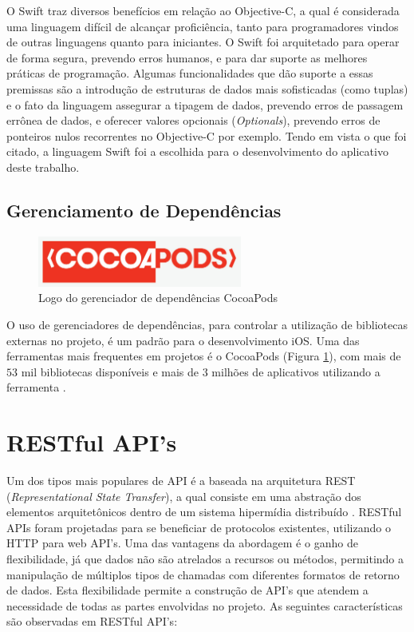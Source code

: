 O Swift traz diversos benefícios em relação ao Objective-C, a qual é considerada uma linguagem difícil de alcançar proficiência, tanto para programadores vindos de outras linguagens quanto para iniciantes. O Swift foi arquitetado para operar de forma segura, prevendo erros humanos, e para dar suporte as melhores práticas de programação. Algumas funcionalidades que dão suporte a essas premissas são a introdução de estruturas de dados mais sofisticadas (como tuplas) e o fato da linguagem assegurar a tipagem de dados, prevendo erros de passagem errônea de dados, e oferecer valores opcionais (\textit{Optionals}), prevendo erros de ponteiros nulos recorrentes no Objective-C por exemplo. Tendo em vista o que foi citado, a linguagem Swift foi a escolhida para o desenvolvimento do aplicativo deste trabalho.

\subsection{Gerenciamento de Dependências}
\begin{figure}[h]
    \centering
    \includegraphics[width=0.6\textwidth]{pfc/figuras/cocoapods.png}
    \caption{Logo do gerenciador de dependências CocoaPods}
    \label{fig:cocoapods}
\end{figure}
O uso de gerenciadores de dependências, para controlar a utilização de bibliotecas externas no projeto, é um padrão para o desenvolvimento iOS. Uma das ferramentas mais frequentes em projetos é o CocoaPods (Figura \ref{fig:cocoapods}), com mais de $53$ mil bibliotecas disponíveis e mais de $3$ milhões de aplicativos utilizando a ferramenta \cite{cocoapods}.

\section{RESTful API's}
Um dos tipos mais populares de API é a baseada na arquitetura REST (\textit{Representational State Transfer}), a qual consiste em uma abstração dos elementos arquitetônicos dentro de um sistema hipermídia distribuído \cite{rest-api}. 
RESTful APIs foram projetadas para se beneficiar de protocolos existentes, utilizando o HTTP para web API's. Uma das vantagens da abordagem é o ganho de flexibilidade, já que dados não são atrelados a recursos ou métodos, permitindo a manipulação de múltiplos tipos de chamadas com diferentes formatos de retorno de dados. Esta flexibilidade permite a construção de API's que atendem a necessidade de todas as partes envolvidas no projeto. As seguintes características são observadas em RESTful API's:


